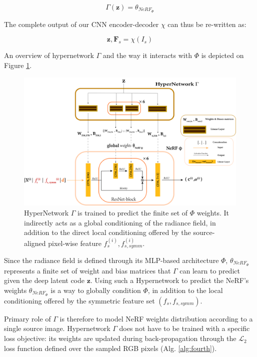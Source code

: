\begin{equation}
  \Gamma(\mathbf{z}) = \theta_{NeRF_{\Phi}} 
\end{equation}

The complete output of our CNN encoder-decoder $\chi$ can thus be re-written as:

\begin{equation}
    \textbf{z}, \textbf{F}_{s} = \chi(I_{s})
\end{equation}

An overview of hypernetwork $\Gamma$ and the way it interacts with $\Phi$ is depicted on Figure \ref{fig:supp_hyper_nerf}.

\begin{figure}[htp!]
  \begin{center}
\includegraphics[width=\linewidth]{images/epinerf/supp_hyper_nerf.png}
\caption{HyperNetwork $\Gamma$ is trained to predict  the finite set of $\Phi$ weights. It indirectly acts as a global conditioning of the radiance field, in addition to the direct local conditioning offered by the source-aligned pixel-wise feature $f_{s}^{(i)},f_{s,symm}^{(i)}$.}
\label{fig:supp_hyper_nerf}
\end{center}
\end{figure} 

Since the radiance field is defined through its MLP-based architecture $\Phi$, $\theta_{NeRF_{\Phi}}$ represents a finite set of weight and bias matrices that $\Gamma$ can learn to predict given the deep latent code $\mathbf{z}$. Using such a Hypernetwork to predict the NeRF's weights $\theta_{NeRF_{\Phi}}$ is a way to globally condition $\Phi$, in addition to the local conditioning offered by the symmetric feature set $(f_{s},f_{s,symm})$.   

Primary role of $\Gamma$ is therefore to model NeRF weights distribution according to a single source image. Hypernetwork $\Gamma$ does not have to be trained with a specific loss objective: its weights are updated during back-propagation through the $\mathcal{L}_{2}$ loss function defined over the sampled RGB pixels (Alg. \ref{alg:fourth}). 

